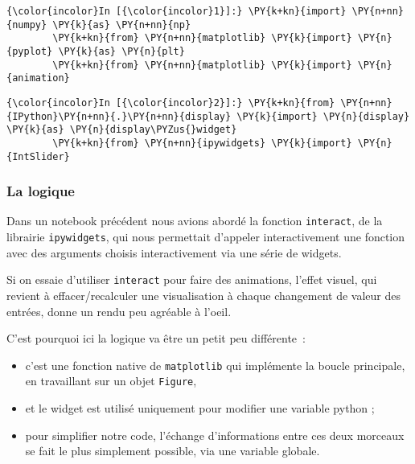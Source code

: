     \begin{Verbatim}[commandchars=\\\{\},frame=single,framerule=0.3mm,rulecolor=\color{cellframecolor}]
{\color{incolor}In [{\color{incolor}1}]:} \PY{k+kn}{import} \PY{n+nn}{numpy} \PY{k}{as} \PY{n+nn}{np}
        \PY{k+kn}{from} \PY{n+nn}{matplotlib} \PY{k}{import} \PY{n}{pyplot} \PY{k}{as} \PY{n}{plt}
        \PY{k+kn}{from} \PY{n+nn}{matplotlib} \PY{k}{import} \PY{n}{animation}
\end{Verbatim}


    \begin{Verbatim}[commandchars=\\\{\},frame=single,framerule=0.3mm,rulecolor=\color{cellframecolor}]
{\color{incolor}In [{\color{incolor}2}]:} \PY{k+kn}{from} \PY{n+nn}{IPython}\PY{n+nn}{.}\PY{n+nn}{display} \PY{k}{import} \PY{n}{display} \PY{k}{as} \PY{n}{display\PYZus{}widget}
        \PY{k+kn}{from} \PY{n+nn}{ipywidgets} \PY{k}{import} \PY{n}{IntSlider}
\end{Verbatim}


    \hypertarget{la-logique}{%
\subsubsection{La logique}\label{la-logique}}

    Dans un notebook précédent nous avions abordé la fonction
\texttt{interact}, de la librairie \texttt{ipywidgets}, qui nous
permettait d'appeler interactivement une fonction avec des arguments
choisis interactivement via une série de widgets.

Si on essaie d'utiliser \texttt{interact} pour faire des animations,
l'effet visuel, qui revient à effacer/recalculer une visualisation à
chaque changement de valeur des entrées, donne un rendu peu agréable à
l'oeil.

C'est pourquoi ici la logique va être un petit peu différente~:

\begin{itemize}
\tightlist
\item
  c'est une fonction native de \texttt{matplotlib} qui implémente la
  boucle principale, en travaillant sur un objet \texttt{Figure},
\item
  et le widget est utilisé uniquement pour modifier une variable python
  ;
\item
  pour simplifier notre code, l'échange d'informations entre ces deux
  morceaux se fait le plus simplement possible, via une variable
  globale.
\end{itemize}

